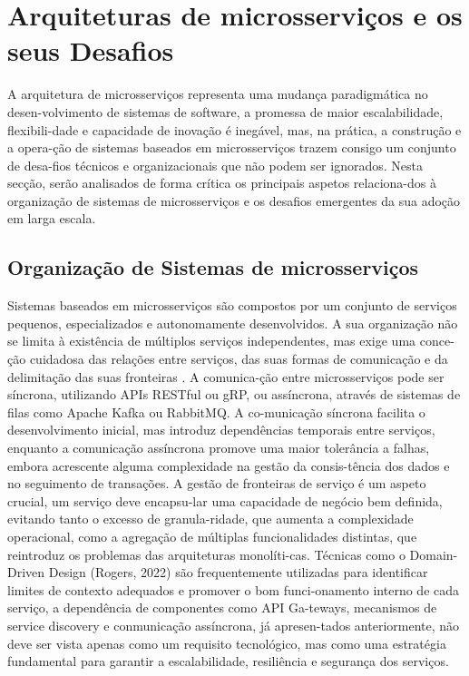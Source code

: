 \section{Arquiteturas de microsserviços e os seus Desafios}

A arquitetura de microsserviços representa uma mudança paradigmática no desen-volvimento de sistemas de software, a promessa de maior escalabilidade, flexibili-dade e capacidade de inovação é inegável, mas, na prática, a construção e a opera-ção de sistemas baseados em microsserviços trazem consigo um conjunto de desa-fios técnicos e organizacionais que não podem ser ignorados.
Nesta secção, serão analisados de forma crítica os principais aspetos relaciona-dos à organização de sistemas de microsserviços e os desafios emergentes da sua adoção em larga escala.

\subsection{Organização de Sistemas de microsserviços}

Sistemas baseados em microsserviços são compostos por um conjunto de serviços pequenos, especializados e autonomamente desenvolvidos. A sua organização não se limita à existência de múltiplos serviços independentes, mas exige uma conce-ção cuidadosa das relações entre serviços, das suas formas de comunicação e da delimitação das suas fronteiras \cite{Railic2021, Sambasivan2014}. A comunica-ção entre microsserviços pode ser síncrona, utilizando APIs RESTful ou gRP, ou assíncrona, através de sistemas de filas como Apache Kafka ou RabbitMQ. A co-municação síncrona facilita o desenvolvimento inicial, mas introduz dependências temporais entre serviços, enquanto a comunicação assíncrona promove uma maior tolerância a falhas, embora acrescente alguma complexidade na gestão da consis-tência dos dados e no seguimento de transações.
A gestão de fronteiras de serviço é um aspeto crucial, um serviço deve encapsu-lar uma capacidade de negócio bem definida, evitando tanto o excesso de granula-ridade, que aumenta a complexidade operacional, como a agregação de múltiplas funcionalidades distintas, que reintroduz os problemas das arquiteturas monolíti-cas. 
Técnicas como o Domain-Driven Design (Rogers, 2022) são frequentemente utilizadas para identificar limites de contexto adequados e promover o bom funci-onamento interno de cada serviço, a dependência de componentes como API Ga-teways, mecanismos de service discovery e conmunicação assíncrona, já apresen-tados anteriormente, não deve ser vista apenas como um requisito tecnológico, mas como uma estratégia fundamental para garantir a escalabilidade, resiliência e segurança dos serviços.

